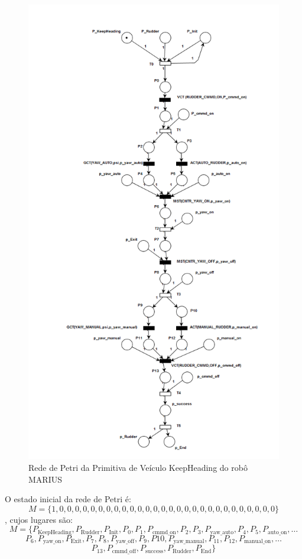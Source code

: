 \begin{figure}[H]
\centering
\includegraphics[width=0.87\columnwidth]{figs/SILVA_3.png}
\caption{Rede de Petri da Primitiva de Veículo KeepHeading do robô MARIUS}
\label{SILVA_3}
\end{figure}

O estado inicial da rede de Petri é: $$M
=\{1,0,0,0,0,0,0,0,0,0,0,0,0,0,0,0,0,0,0,0,0,0,0,0,0,0,0,0,0\}$$, cujos lugares
são:
$$M
=\{P_{\textrm{KeepHeading}},P_{\textrm{Rudder}},P_{\textrm{Init}},P_0,P_1,P_{\textrm{cmmd\_on}},P_2,P_3,P_{\textrm{yaw\_auto}},P_4,P_5,P_{\textrm{auto\_on}},\ldots$$
$$P_6,P_{\textrm{yaw\_on}},P_{\textrm{Exit}},P_7,P_8,P_{\textrm{yaw\_off}},P_9,P{10},P_{\textrm{yaw\_manual}},P_{11},P_{12},P_{\textrm{manual\_on}},\ldots$$
$$P_{13},P_{\textrm{cmmd\_off}},P_{\textrm{success}},P_{\textrm{Rudder}},P_{\textrm{End}}\}$$

